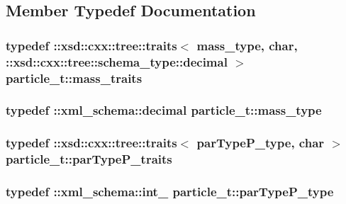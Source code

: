 \subsection{Member Typedef Documentation}
\hypertarget{classparticle__t_ab9c6167e13b441bc375cdc08fa045012}{
\subsubsection[{mass\-\_\-traits}]{\setlength{\rightskip}{0pt plus 5cm}typedef \-::xsd\-::cxx\-::tree\-::traits$<$ {\bf mass\-\_\-type}, char, \-::xsd\-::cxx\-::tree\-::schema\-\_\-type\-::decimal $>$ {\bf particle\-\_\-t\-::mass\-\_\-traits}}}\label{classparticle__t_ab9c6167e13b441bc375cdc08fa045012}
\hypertarget{classparticle__t_a38e9f2cf40d61fa77b19f068d044d294}{
\subsubsection[{mass\-\_\-type}]{\setlength{\rightskip}{0pt plus 5cm}typedef \-::{\bf xml\-\_\-schema\-::decimal} {\bf particle\-\_\-t\-::mass\-\_\-type}}}\label{classparticle__t_a38e9f2cf40d61fa77b19f068d044d294}
\hypertarget{classparticle__t_a8c9ecdb6ceb5ee765e0eb91714ebb8c8}{
\subsubsection[{par\-Type\-P\-\_\-traits}]{\setlength{\rightskip}{0pt plus 5cm}typedef \-::xsd\-::cxx\-::tree\-::traits$<$ {\bf par\-Type\-P\-\_\-type}, char $>$ {\bf particle\-\_\-t\-::par\-Type\-P\-\_\-traits}}}\label{classparticle__t_a8c9ecdb6ceb5ee765e0eb91714ebb8c8}
\hypertarget{classparticle__t_ab30c5ebbd1c4aabb95799f34942b72b2}{
\subsubsection[{par\-Type\-P\-\_\-type}]{\setlength{\rightskip}{0pt plus 5cm}typedef \-::{\bf xml\-\_\-schema\-::int\-\_\-} {\bf particle\-\_\-t\-::par\-Type\-P\-\_\-type}}}\label{classparticle__t_ab30c5ebbd1c4aabb95799f34942b72b2}
